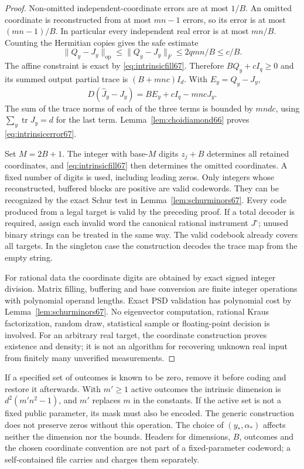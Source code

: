 \begin{proof}
Non-omitted independent-coordinate errors are at most $1/B$. An omitted
coordinate is reconstructed from at most $mn-1$ errors, so its error
is at most $(mn-1)/B$. In particular every independent real error is
at most $mn/B$. Counting the Hermitian copies gives the safe estimate
\[
 \|Q_y-J_y\|_{\mathrm{op}}\le\|Q_y-J_y\|_F
 \le 2qmn/B\le c/B.
\]
The affine constraint is exact by \eqref{eq:intrinsicfill67}. Therefore
$BQ_y+cI_q\ge0$ and its summed output partial trace is
$(B+mnc)I_d$. With $E_y=Q_y-J_y$,
\[
 D(\widehat J_y-J_y)=BE_y+cI_q-mncJ_y.
\]
The sum of the trace norms of each of the three terms is bounded by
$mndc$, using $\sum_y\operatorname{tr}J_y=d$ for the last term.
Lemma~\ref{lem:choidiamond66} proves \eqref{eq:intrinsicerror67}.

Set $M=2B+1$. The integer with base-$M$ digits $z_j+B$ determines
all retained coordinates, and \eqref{eq:intrinsicfill67} then determines
the omitted coordinates. A fixed number of digits is used, including
leading zeros. Only integers whose reconstructed, buffered blocks are
positive are valid codewords. They can be recognized by the exact
Schur test in Lemma~\ref{lem:schurminors67}. Every code produced from a
legal target is valid by the preceding proof. If a total decoder is
required, assign each invalid word the canonical rational instrument
$J^\circ$; unused binary strings can be treated in the same way.
The valid codebook already covers all targets. In the singleton case
the construction decodes the trace map from the empty string.

For rational data the coordinate digits are obtained by exact signed
integer division. Matrix filling, buffering and base conversion are
finite integer operations with polynomial operand lengths. Exact PSD
validation has polynomial cost by Lemma~\ref{lem:schurminors67}.
No eigenvector computation, rational Kraus factorization, random draw,
statistical sample or floating-point decision is involved. For an
arbitrary real target, the coordinate construction proves existence
and density; it is not an algorithm for recovering unknown real input
from finitely many unverified measurements.
\end{proof}

\begin{remark}\label{rem:zerocode67}
If a specified set of outcomes is known to be zero, remove it before
coding and restore it afterwards. With $m'\ge1$ active outcomes the
intrinsic dimension is $d^2(m'n^2-1)$, and $m'$ replaces $m$ in the
constants. If the active set is not a fixed public parameter, its mask
must also be encoded. The generic construction does not preserve zeros
without this operation. The choice of $(y_*,\alpha_*)$ affects neither
the dimension nor the bounds. Headers for dimensions, $B$, outcomes
and the chosen coordinate convention are not part of a fixed-parameter
codeword; a self-contained file carries and charges them separately.
\end{remark}
